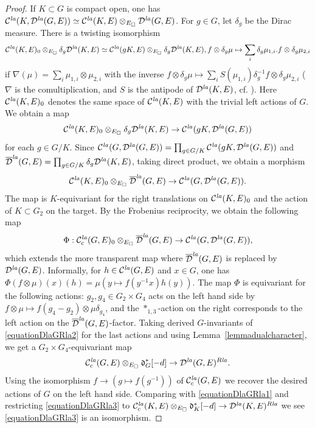 \documentclass[a4paper,10pt]{amsart}
\theoremstyle{remark}
\theoremstyle{definition}
\theoremstyle{plain}
\numberwithin{equation}{section}
\newcommand{\calC}{{\mathcal C}}
\newcommand{\calD}{{\mathcal D}}
\newcommand{\la}{{\it la}}
\begin{document}
\begin{proof}
	If $K\subset G$ is compact open, one has $\calC^{\la}(K,\calD^{\la}(G,E))\simeq \calC^{\la}(K,E)\otimes_{E_{\square}}\calD^{\la}(G,E)$. For $g\in G$, let $\delta_g$ be the Dirac measure. There is a twisting isomorphism 
	\[\calC^{\la}(K,E)_0\otimes_{E_{\square}}\delta_g\calD^{\la}(K,E)\simeq \calC^{\la}(gK,E)\otimes_{E_{\square}}\delta_g\calD^{\la}(K,E), f\otimes \delta_g\mu\mapsto \sum_i \delta_g\mu_{1,i}.f\otimes \delta_g\mu_{2,i}\] 
	if $\nabla(\mu)=\sum_i\mu_{1,i}\otimes\mu_{2,i}$ with the inverse $f\otimes \delta_g\mu\mapsto\sum_i S(\mu_{1,i}) \delta_g^{-1}f\otimes \delta_g\mu_{2,i}$ ($\nabla$ is the comultiplication, and $S$ is the antipode of $\calD^{\la}(K,E)$, cf. \cite[Prop.~A.2.1(3)]{JC23}). Here $\calC^{\la}(K,E)_0$ denotes the same space of $\calC^{\la}(K,E)$ with the trivial left actions of $G$. We obtain a map 
\[\calC^{\la}(K,E)_0\otimes_{E_{\square}}\delta_g\calD^{\la}(K,E)\rightarrow \calC^{\la}(gK,\calD^{\la}(G,E))\] 
for each $g\in G/K$. Since $\calC^{\la}(G,\calD^{\la}(G,E))=\prod_{g\in G/K}\calC^{\la}(gK,\calD^{\la}(G,E))$ and $\overline{\calD}^{\la}(G,E)=\prod_{g\in G/K}\delta_g\calD^{\la}(K,E)$, taking direct product, we obtain a morphism 
\begin{align*}
	\calC^{\la}(K,E)_0\otimes_{E_{\square}}\overline{\calD}^{\la}(G,E)\rightarrow \calC^{\la}(G,\calD^{\la}(G,E)).
\end{align*} 
The map is $K$-equivariant for the right translations on $\calC^{\la}(K,E)_0$ and the action of $K\subset G_2$ on the target. By the Frobenius reciprocity, we obtain the following map 
\begin{align}\label{equationDlaGRla2}
	\Phi:\calC_c^{\la}(G,E)_0\otimes_{E_{\square}}\overline{\calD}^{\la}(G,E)\rightarrow \calC^{\la}(G,\calD^{\la}(G,E)),
\end{align}
which extends the more transparent map where $\overline{\calD}^{\la}(G,E)$ is replaced by $\calD^{\la}(G,E)$. Informally, for $h\in\calC^{\la}(G,E)$ and $x\in G$, one has $\Phi(f\otimes \mu)(x)(h)=\mu(y\mapsto f(y^{-1}x)h(y))$. The map $\Phi$ is equivariant for the following actions: $g_2,g_4\in G_2\times G_4$ acts on the left hand side by $f\otimes \mu\mapsto f(g_4-g_2)\otimes \mu\delta_{g_4}$, and the $*_{1,3}$-action on the right corresponds to the left action on the $\overline{\calD}^{\la}(G,E)$-factor. Taking derived $G$-invariants of \eqref{equationDlaGRla2} for the last actions and using Lemma~\ref{lemmadualcharacter}, we get a $G_2\times G_4$-equivariant map
\begin{align}\label{equationDlaGRla3}
	\calC_c^{\la}(G,E)\otimes_{E_{\square}}\mathfrak{d}_G^*[-d]\to \calD^{\la}(G,E)^{R\la}.
\end{align} 
Using the isomorphism $f\to (g\mapsto f(g^{-1}))$ of $\calC^{\la}_c(G,E)$ we recover the desired actions of $G$ on the left hand side. Comparing with \eqref{equationDlaGRla1} and restricting \eqref{equationDlaGRla3} to $\calC_c^{\la}(K,E)\otimes_{E_{\square}}\mathfrak{d}_K^*[-d]\to \calD^{\la}(K,E)^{R\la}$ we see \eqref{equationDlaGRla3} is an isomorphism.
\end{proof}
\end{document}

